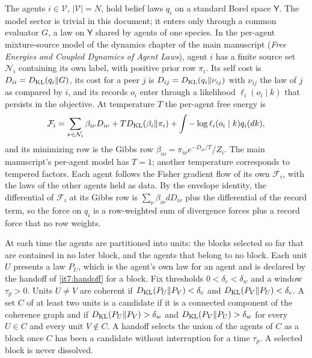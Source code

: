 \documentclass[11pt,letterpaper]{report}
\begin{document}
The agents $i\in\mathcal V$, $|\mathcal V|=N$, hold belief laws $q_i$ on a standard Borel space $\mathsf Y$. The model sector is trivial in this document; it enters only through a common evaluator $G$, a law on $\mathsf Y$ shared by agents of one species. In the per-agent mixture-source model of the dynamics chapter of the main manuscript (\emph{Free Energies and Coupled Dynamics of Agent Laws}), agent $i$ has a finite source set $\mathcal N_i$ containing its own label, with positive prior row $\pi_i$. Its self cost is $D_{ii}=D_{\mathrm{KL}}(q_i\Vert G)$, its cost for a peer $j$ is $D_{ij}=D_{\mathrm{KL}}(q_i\Vert\nu_{ij})$ with $\nu_{ij}$ the law of $j$ as compared by $i$, and its records $o_i$ enter through a likelihood $\ell_i(o_i\mid k)$ that persists in the objective. At temperature $T$ the per-agent free energy is
\begin{equation}
\mathcal F_i=\sum_{\nu\in\mathcal N_i}\beta_{i\nu}D_{i\nu}+TD_{\mathrm{KL}}(\beta_i\Vert\pi_i)+\int-\log\ell_i(o_i\mid k)q_i(dk),
\label{it7:fe}
\end{equation}
and its minimizing row is the Gibbs row $\beta_{i\nu}=\pi_{i\nu}e^{-D_{i\nu}/T}/Z_i$. The main manuscript's per-agent model has $T=1$; another temperature corresponds to tempered factors. Each agent follows the Fisher gradient flow of its own $\mathcal F_i$, with the laws of the other agents held as data. By the envelope identity, the differential of $\mathcal F_i$ at its Gibbs row is $\sum_\nu\beta_{i\nu}dD_{i\nu}$ plus the differential of the record term, so the force on $q_i$ is a row-weighted sum of divergence forces plus a record force that no row weights.

At each time the agents are partitioned into units: the blocks selected so far that are contained in no later block, and the agents that belong to no block. Each unit $U$ presents a law $P_U$, which is the agent's own law for an agent and is declared by the handoff of \cref{it7:handoff} for a block. Fix thresholds $0<\delta_c<\delta_w$ and a window $\tau_p>0$. Units $U\ne V$ are coherent if $D_{\mathrm{KL}}(P_U\Vert P_V)<\delta_c$ and $D_{\mathrm{KL}}(P_V\Vert P_U)<\delta_c$. A set $C$ of at least two units is a candidate if it is a connected component of the coherence graph and if $D_{\mathrm{KL}}(P_U\Vert P_V)>\delta_w$ and $D_{\mathrm{KL}}(P_V\Vert P_U)>\delta_w$ for every $U\in C$ and every unit $V\notin C$. A handoff selects the union of the agents of $C$ as a block once $C$ has been a candidate without interruption for a time $\tau_p$. A selected block is never dissolved.
\end{document}
